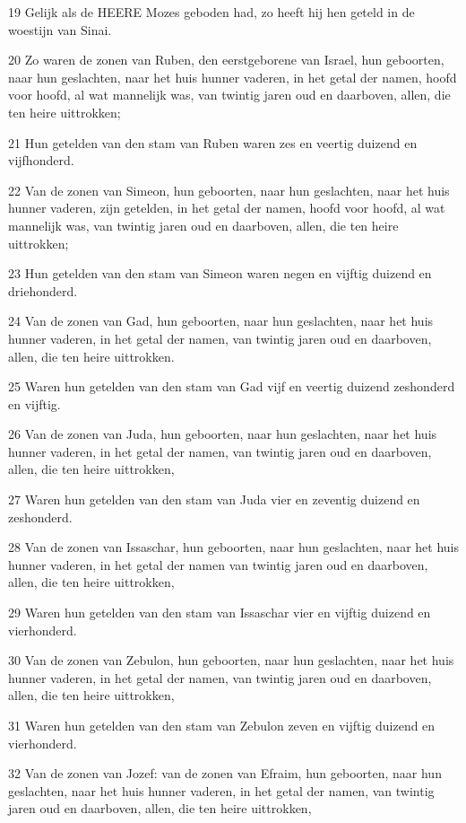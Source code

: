 \par 19 Gelijk als de HEERE Mozes geboden had, zo heeft hij hen geteld in de woestijn van Sinai.
\par 20 Zo waren de zonen van Ruben, den eerstgeborene van Israel, hun geboorten, naar hun geslachten, naar het huis hunner vaderen, in het getal der namen, hoofd voor hoofd, al wat mannelijk was, van twintig jaren oud en daarboven, allen, die ten heire uittrokken;
\par 21 Hun getelden van den stam van Ruben waren zes en veertig duizend en vijfhonderd.
\par 22 Van de zonen van Simeon, hun geboorten, naar hun geslachten, naar het huis hunner vaderen, zijn getelden, in het getal der namen, hoofd voor hoofd, al wat mannelijk was, van twintig jaren oud en daarboven, allen, die ten heire uittrokken;
\par 23 Hun getelden van den stam van Simeon waren negen en vijftig duizend en driehonderd.
\par 24 Van de zonen van Gad, hun geboorten, naar hun geslachten, naar het huis hunner vaderen, in het getal der namen, van twintig jaren oud en daarboven, allen, die ten heire uittrokken.
\par 25 Waren hun getelden van den stam van Gad vijf en veertig duizend zeshonderd en vijftig.
\par 26 Van de zonen van Juda, hun geboorten, naar hun geslachten, naar het huis hunner vaderen, in het getal der namen, van twintig jaren oud en daarboven, allen, die ten heire uittrokken,
\par 27 Waren hun getelden van den stam van Juda vier en zeventig duizend en zeshonderd.
\par 28 Van de zonen van Issaschar, hun geboorten, naar hun geslachten, naar het huis hunner vaderen, in het getal der namen van twintig jaren oud en daarboven, allen, die ten heire uittrokken,
\par 29 Waren hun getelden van den stam van Issaschar vier en vijftig duizend en vierhonderd.
\par 30 Van de zonen van Zebulon, hun geboorten, naar hun geslachten, naar het huis hunner vaderen, in het getal der namen, van twintig jaren oud en daarboven, allen, die ten heire uittrokken,
\par 31 Waren hun getelden van den stam van Zebulon zeven en vijftig duizend en vierhonderd.
\par 32 Van de zonen van Jozef: van de zonen van Efraim, hun geboorten, naar hun geslachten, naar het huis hunner vaderen, in het getal der namen, van twintig jaren oud en daarboven, allen, die ten heire uittrokken,
